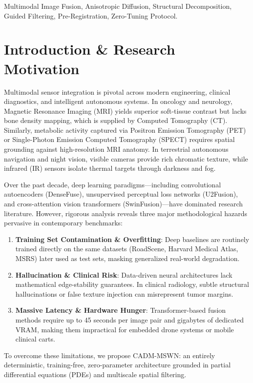 \documentclass[conference]{IEEEtran}
\begin{document}
\begin{IEEEkeywords}
Multimodal Image Fusion, Anisotropic Diffusion, Structural Decomposition, Guided Filtering, Pre-Registration, Zero-Tuning Protocol.
\end{IEEEkeywords}

\section{Introduction \& Research Motivation}
Multimodal sensor integration is pivotal across modern engineering, clinical diagnostics, and intelligent autonomous systems. In oncology and neurology, Magnetic Resonance Imaging (MRI) yields superior soft-tissue contrast but lacks bone density mapping, which is supplied by Computed Tomography (CT). Similarly, metabolic activity captured via Positron Emission Tomography (PET) or Single-Photon Emission Computed Tomography (SPECT) requires spatial grounding against high-resolution MRI anatomy. In terrestrial autonomous navigation and night vision, visible cameras provide rich chromatic texture, while infrared (IR) sensors isolate thermal targets through darkness and fog.

Over the past decade, deep learning paradigms---including convolutional autoencoders (DenseFuse), unsupervised perceptual loss networks (U2Fusion), and cross-attention vision transformers (SwinFusion)---have dominated research literature. However, rigorous analysis reveals three major methodological hazards pervasive in contemporary benchmarks:
\begin{enumerate}
    \item \textbf{Training Set Contamination \& Overfitting}: Deep baselines are routinely trained directly on the same datasets (RoadScene, Harvard Medical Atlas, MSRS) later used as test sets, masking generalized real-world degradation.
    \item \textbf{Hallucination \& Clinical Risk}: Data-driven neural architectures lack mathematical edge-stability guarantees. In clinical radiology, subtle structural hallucinations or false texture injection can misrepresent tumor margins.
    \item \textbf{Massive Latency \& Hardware Hunger}: Transformer-based fusion methods require up to 45 seconds per image pair and gigabytes of dedicated VRAM, making them impractical for embedded drone systems or mobile clinical carts.
\end{enumerate}

To overcome these limitations, we propose CADM-MSWN: an entirely deterministic, training-free, zero-parameter architecture grounded in partial differential equations (PDEs) and multiscale spatial filtering.
\end{document}

